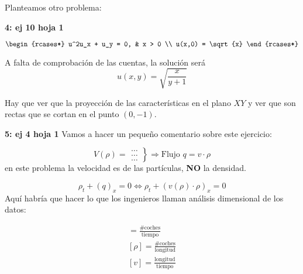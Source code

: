 	Planteamos otro problema:
	\begin{example}{\bf 4: ej 10 hoja 1}

		\[
		\begin{rcases*}
			u^2u_x + u_y = 0, & x > 0 \\
			u(x,0) = \sqrt{x}
		\end{rcases*}
		 \]

		A falta de comprobación de las cuentas, la solución será \[u(x,y) = \sqrt{\frac{x}{y+1}} \]

		Hay que ver que la proyección de las características en el plano $XY$ y ver que son rectas que se cortan en el punto $(0,-1)$.

	\end{example}

	\begin{example}{\bf 5: ej 4 hoja 1}
		Vamos a hacer un pequeño comentario sobre este ejercicio:

		\[ V(\rho) =
		\left.
		\begin{array}{l}
			… \\
			… \\
			…
		\end{array}
		\right\} \Rightarrow \text{Flujo } q = v \cdot \rho
		\]
		\obs en este problema la velocidad es de las partículas, {\bf NO} la densidad.

		$$\rho_t + (q)_x = 0 \iff \rho_t + (v(\rho) \cdot \rho)_x = 0$$
		Aquí habría que hacer lo que los ingenieros llaman análisis dimensional de los datos:

		\begin{gather*}
		[y] = \frac{\text{\# coches}}{\text{tiempo}}\\
		[\rho] = \frac{\text{\# coches}}{\text{longitud}}\\
		[v] = \frac{\text{longitud}}{\text{tiempo}}
		\end{gather*}



	\end{example}

